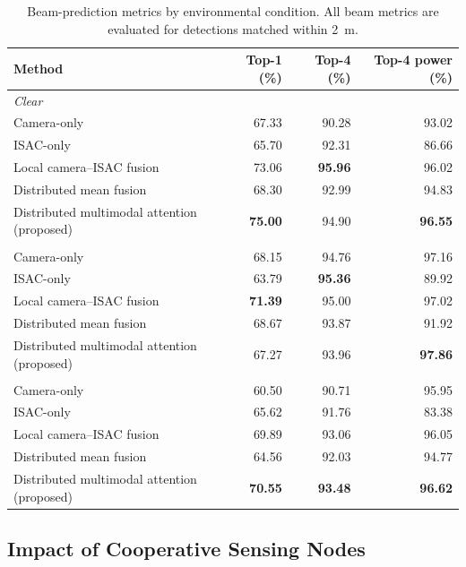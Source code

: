 \begin{table}[H]
    \centering
    \caption{Beam-prediction metrics by environmental condition.  All beam
    metrics are evaluated for detections matched within 2~m.}
    \label{tab:experiments-weather-beam}
    \small
    \renewcommand{\arraystretch}{1.08}
    \begin{tabular}{lrrr}
        \toprule
        Method & Top-1 (\%) & Top-4 (\%) & Top-4 power (\%) \\
        \midrule
        \multicolumn{4}{l}{\textit{Clear}} \\
        Camera-only & 67.33 & 90.28 & 93.02 \\
        ISAC-only & 65.70 & 92.31 & 86.66 \\
        Local camera--ISAC fusion & 73.06 & \textbf{95.96} & 96.02 \\
        Distributed mean fusion & 68.30 & 92.99 & 94.83 \\
        Distributed multimodal attention (proposed) & \textbf{75.00} & 94.90 & \textbf{96.55} \\
        \addlinespace
        \multicolumn{4}{l}{\textit{Rain/Fog}} \\
        Camera-only & 68.15 & 94.76 & 97.16 \\
        ISAC-only & 63.79 & \textbf{95.36} & 89.92 \\
        Local camera--ISAC fusion & \textbf{71.39} & 95.00 & 97.02 \\
        Distributed mean fusion & 68.67 & 93.87 & 91.92 \\
        Distributed multimodal attention (proposed) & 67.27 & 93.96 & \textbf{97.86} \\
        \addlinespace
        \multicolumn{4}{l}{\textit{Night}} \\
        Camera-only & 60.50 & 90.71 & 95.95 \\
        ISAC-only & 65.62 & 91.76 & 83.38 \\
        Local camera--ISAC fusion & 69.89 & 93.06 & 96.05 \\
        Distributed mean fusion & 64.56 & 92.03 & 94.77 \\
        Distributed multimodal attention (proposed) & \textbf{70.55} & \textbf{93.48} & \textbf{96.62} \\
        \bottomrule
    \end{tabular}
\end{table}

\subsection{Impact of Cooperative Sensing Nodes}
\label{subsec:experiments-nearby-nodes}

